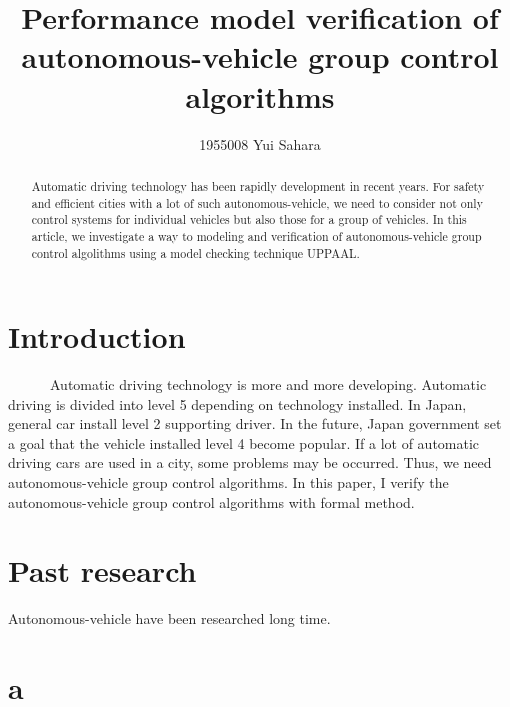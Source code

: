 \documentclass[]{article}
\title{Performance model verification of autonomous-vehicle group control algorithms}
\author{1955008	Yui Sahara}
\date{}
\begin{document}
\maketitle
\begin{abstract}
Automatic driving technology has been rapidly development in recent years.  For safety and efficient cities with a lot of such autonomous-vehicle, we need to consider not only control systems for individual vehicles but also those for a group of vehicles.  In this article, we investigate a way to modeling and verification of autonomous-vehicle group control algolithms using a model checking technique UPPAAL.
\end{abstract}

\section{Introduction}
　　　Automatic driving technology is more and more developing.  Automatic driving is divided into level  5 depending on technology installed.  In Japan, general car install level 2 supporting driver.  In the future,  Japan government set a goal that the vehicle installed level 4 become popular.  If a lot of automatic driving cars are used in a city, some problems may be occurred.  Thus, we need autonomous-vehicle group control algorithms.  In this paper, I verify the autonomous-vehicle group control algorithms with formal method.
\section{Past research}
	Autonomous-vehicle have been researched long time.  
\section{a}
\begin{thebibliography}{1}
\end{thebibliography}
\end{document}
